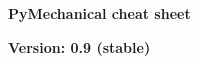 \documentclass[9pt,landscape]{article}
\begin{document}
\raggedright
\footnotesize

\begin{center}
     \Huge{\textbf{PyMechanical cheat sheet}} \\
\end{center}

\begin{center}
  \small{\textbf{Version: 0.9 (stable)}} \\
\end{center}

\vspace{-0.40cm}
\noindent\makebox[\linewidth]{\rule{\paperwidth}{2pt}}
\end{document}
